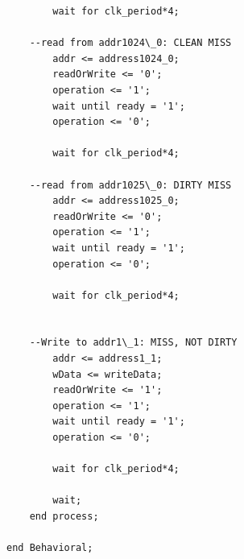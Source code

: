 \documentclass{article}
\begin{document}
\begin{lstlisting}
        wait for clk_period*4;

    --read from addr1024\_0: CLEAN MISS
        addr <= address1024_0;
        readOrWrite <= '0';
        operation <= '1';
        wait until ready = '1';
        operation <= '0';

        wait for clk_period*4;

    --read from addr1025\_0: DIRTY MISS
        addr <= address1025_0;
        readOrWrite <= '0';
        operation <= '1';
        wait until ready = '1';
        operation <= '0';

        wait for clk_period*4;


    --Write to addr1\_1: MISS, NOT DIRTY
        addr <= address1_1;
        wData <= writeData;
        readOrWrite <= '1';
        operation <= '1';
        wait until ready = '1';
        operation <= '0';

        wait for clk_period*4;

        wait;
    end process;

end Behavioral;
\end{lstlisting}
\end{document}
